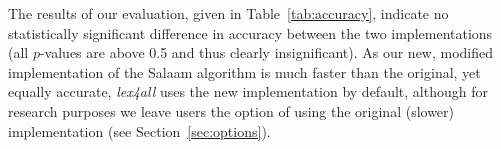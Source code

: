 \documentclass[11pt]{article}
\begin{document}
The results of our evaluation, given in Table~\ref{tab:accuracy}, indicate no statistically significant difference in accuracy between the two implementations 
(all $p$-values are above 0.5 and thus clearly insignificant).  
As our new, modified implementation of the Salaam algorithm 
is much faster than the original, yet equally accurate,
\textit{lex4all} uses the new implementation by default, although for research purposes we leave users the option of using the original (slower) implementation (see Section~\ref{sec:options}).



%
%
\end{document}
